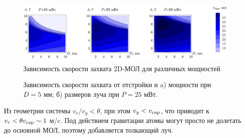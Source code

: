 \begin{figure}[ht]
    \centering
    \includegraphics[width=1.0\textwidth]{figs/vcap2d_delta-Ds.png}
    \caption{Зависимость скорости захвата 2D-МОЛ для различных мощностей}
    \label{fig:vcapDs}
\end{figure}



\begin{figure}[ht]
    \centering
    \hspace{10 mm} 
    \vspace{-3mm}
    \caption{Зависимость скорости захвата от отстройки 
    и a) мощности при $D=5$ мм; б) размеров луча при $P = 25$ мВт.
    }
    \label{fig:vcapflat}
\end{figure}


Из геометрии системы $v_r / v_y < \theta$, при этом $v_y < v_{\textnormal{cap}}$, что приводит к $v_r < \theta v_{\textnormal{cap}} \sim 1$ м/c. Под действием гравитации атомы могут просто не долетать до основной МОЛ, поэтому добавляется толкающий луч. 

